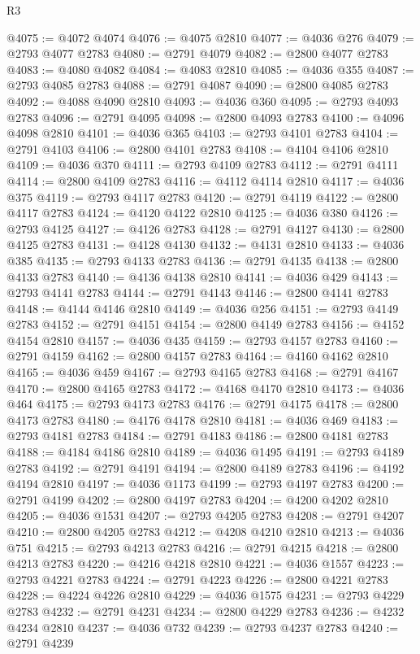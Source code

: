 \begin{lexlean}{R3}
\begin{coremodule}
@4075 := @4072 @4074
@4076 := @4075 @2810
@4077 := @4036 @276
@4079 := @2793 @4077 @2783
@4080 := @2791 @4079
@4082 := @2800 @4077 @2783
@4083 := @4080 @4082
@4084 := @4083 @2810
@4085 := @4036 @355
@4087 := @2793 @4085 @2783
@4088 := @2791 @4087
@4090 := @2800 @4085 @2783
@4092 := @4088 @4090 @2810
@4093 := @4036 @360
@4095 := @2793 @4093 @2783
@4096 := @2791 @4095
@4098 := @2800 @4093 @2783
@4100 := @4096 @4098 @2810
@4101 := @4036 @365
@4103 := @2793 @4101 @2783
@4104 := @2791 @4103
@4106 := @2800 @4101 @2783
@4108 := @4104 @4106 @2810
@4109 := @4036 @370
@4111 := @2793 @4109 @2783
@4112 := @2791 @4111
@4114 := @2800 @4109 @2783
@4116 := @4112 @4114 @2810
@4117 := @4036 @375
@4119 := @2793 @4117 @2783
@4120 := @2791 @4119
@4122 := @2800 @4117 @2783
@4124 := @4120 @4122 @2810
@4125 := @4036 @380
@4126 := @2793 @4125
@4127 := @4126 @2783
@4128 := @2791 @4127
@4130 := @2800 @4125 @2783
@4131 := @4128 @4130
@4132 := @4131 @2810
@4133 := @4036 @385
@4135 := @2793 @4133 @2783
@4136 := @2791 @4135
@4138 := @2800 @4133 @2783
@4140 := @4136 @4138 @2810
@4141 := @4036 @429
@4143 := @2793 @4141 @2783
@4144 := @2791 @4143
@4146 := @2800 @4141 @2783
@4148 := @4144 @4146 @2810
@4149 := @4036 @256
@4151 := @2793 @4149 @2783
@4152 := @2791 @4151
@4154 := @2800 @4149 @2783
@4156 := @4152 @4154 @2810
@4157 := @4036 @435
@4159 := @2793 @4157 @2783
@4160 := @2791 @4159
@4162 := @2800 @4157 @2783
@4164 := @4160 @4162 @2810
@4165 := @4036 @459
@4167 := @2793 @4165 @2783
@4168 := @2791 @4167
@4170 := @2800 @4165 @2783
@4172 := @4168 @4170 @2810
@4173 := @4036 @464
@4175 := @2793 @4173 @2783
@4176 := @2791 @4175
@4178 := @2800 @4173 @2783
@4180 := @4176 @4178 @2810
@4181 := @4036 @469
@4183 := @2793 @4181 @2783
@4184 := @2791 @4183
@4186 := @2800 @4181 @2783
@4188 := @4184 @4186 @2810
@4189 := @4036 @1495
@4191 := @2793 @4189 @2783
@4192 := @2791 @4191
@4194 := @2800 @4189 @2783
@4196 := @4192 @4194 @2810
@4197 := @4036 @1173
@4199 := @2793 @4197 @2783
@4200 := @2791 @4199
@4202 := @2800 @4197 @2783
@4204 := @4200 @4202 @2810
@4205 := @4036 @1531
@4207 := @2793 @4205 @2783
@4208 := @2791 @4207
@4210 := @2800 @4205 @2783
@4212 := @4208 @4210 @2810
@4213 := @4036 @751
@4215 := @2793 @4213 @2783
@4216 := @2791 @4215
@4218 := @2800 @4213 @2783
@4220 := @4216 @4218 @2810
@4221 := @4036 @1557
@4223 := @2793 @4221 @2783
@4224 := @2791 @4223
@4226 := @2800 @4221 @2783
@4228 := @4224 @4226 @2810
@4229 := @4036 @1575
@4231 := @2793 @4229 @2783
@4232 := @2791 @4231
@4234 := @2800 @4229 @2783
@4236 := @4232 @4234 @2810
@4237 := @4036 @732
@4239 := @2793 @4237 @2783
@4240 := @2791 @4239

\end{coremodule}
\end{lexlean}
